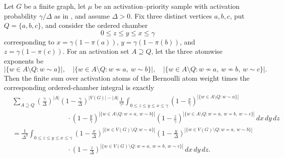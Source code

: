\begin{helper}
Let $G$ be a finite graph, let $\mu$ be an activation--priority sample with
activation probability $\gamma/\Delta$ as in
, and assume $\Delta>0$.  Fix three
distinct vertices $a,b,c$, put $Q=\{a,b,c\}$, and consider the ordered chamber
\[
0\le z\le y\le x\le \gamma
\]
corresponding to $x=\gamma(1-\pi(a))$, $y=\gamma(1-\pi(b))$, and
$z=\gamma(1-\pi(c))$.  For an activation set $A\supseteq Q$, let the three
atomwise exponents be
\[
|\{w\in A\setminus Q:w\sim a\}|,
\quad
|\{w\in A\setminus Q:w\not\sim a,\ w\sim b\}|,
\quad
|\{w\in A\setminus Q:w\not\sim a,\ w\not\sim b,\ w\sim c\}|.
\]
Then the finite sum over activation atoms of the Bernoulli atom weight times
the corresponding ordered-chamber integral is exactly
\[
\begin{aligned}
&\sum_{A\supseteq Q}
\left(\frac{\gamma}{\Delta}\right)^{|A|}
\left(1-\frac{\gamma}{\Delta}\right)^{|V(G)|-|A|}
\frac1{\gamma^3}
\int_{0\le z\le y\le x\le\gamma}
\left(1-\frac{x}{\gamma}\right)^{|\{w\in A\setminus Q:w\sim a\}|} \\
&\qquad\qquad\qquad\qquad\cdot
\left(1-\frac{y}{\gamma}\right)^{|\{w\in A\setminus Q:w\not\sim a,\ w\sim b\}|}
\left(1-\frac{z}{\gamma}\right)^{|\{w\in A\setminus Q:w\not\sim a,\ w\not\sim b,\ w\sim c\}|}
\,dx\,dy\,dz  \\
&=
\frac1{\Delta^3}
\int_{0\le z\le y\le x\le\gamma}
\left(1-\frac{x}{\Delta}\right)^{|\{w\in V(G)\setminus Q:w\sim a\}|}
\left(1-\frac{y}{\Delta}\right)^{|\{w\in V(G)\setminus Q:w\not\sim a,\ w\sim b\}|} \\
&\qquad\qquad\qquad\qquad\cdot
\left(1-\frac{z}{\Delta}\right)^{|\{w\in V(G)\setminus Q:w\not\sim a,\ w\not\sim b,\ w\sim c\}|}
\,dx\,dy\,dz .
\end{aligned}
\]
\end{helper}
